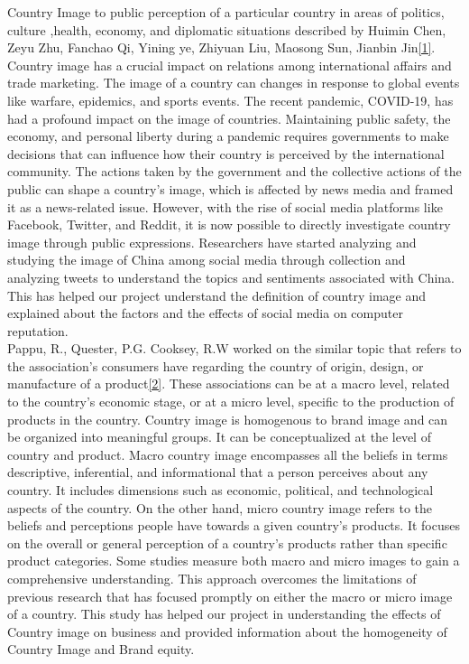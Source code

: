 \documentclass[conference]{IEEEtran}
\begin{document}
	Country Image to public perception of a particular country in areas of politics, culture ,health, economy, and diplomatic situations described by Huimin Chen, Zeyu Zhu, Fanchao Qi, Yining ye, Zhiyuan Liu, Maosong Sun, Jianbin Jin\href{https://www.ncbi.nlm.nih.gov/pmc/articles/PMC8769017/}{[1]}. Country image has a crucial impact on relations among international affairs and trade marketing. The image of a country can changes in response to global events like warfare, epidemics, and sports events. The recent pandemic, COVID-19, has had a profound impact on the image of countries. Maintaining public safety, the economy, and personal liberty during a pandemic requires governments to make decisions that can influence how their country is perceived by the international community. The actions taken by the government and the collective actions of the public can shape a country's image, which is affected by news media and framed it as a news-related issue. However, with the rise of social media platforms like Facebook, Twitter, and Reddit, it is now possible to directly investigate country image through public expressions. Researchers have started analyzing and studying the image of  China among social media through collection and analyzing tweets to understand the topics and sentiments associated with China. This has helped our project understand the definition of country image and explained about the factors and the effects of social media on computer reputation.\\

	Pappu, R., Quester, P.G. Cooksey, R.W worked on the similar topic that refers to the association’s consumers have regarding the country of origin, design, or manufacture of a product\href{https://link.springer.com/article/10.1057/palgrave.jibs.8400293#citeas}{[2]}. These associations can be at a macro level, related to the country's economic stage, or at a micro level, specific to the production of products in the country. Country image is homogenous to brand image and can be organized into meaningful groups. It can be conceptualized at the level of country and product. Macro country image encompasses all the beliefs in terms descriptive, inferential, and informational that a person perceives about any country. It includes dimensions such as economic, political, and technological aspects of the country. On the other hand, micro country image refers to the beliefs and perceptions people have towards a given country’s products. It focuses on the overall or general perception of a country's products rather than specific product categories. Some studies measure both macro and micro images to gain a comprehensive understanding. This approach overcomes the limitations of previous research that has focused promptly on either the macro or micro image of a country. This study has helped our project in understanding the effects of Country image on business and provided information about the homogeneity of Country Image and Brand equity.\\
\end{document}
